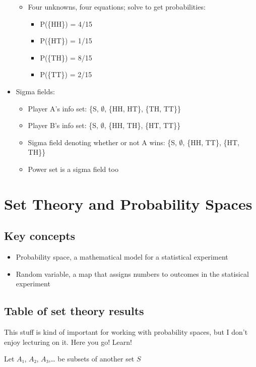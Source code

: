 \begin{itemize}
\begin{itemize}
\item Four unknowns, four equations; solve to get probabilities:
\begin{itemize}
\item P(\{HH\}) = 4/15
\item P(\{HT\}) = 1/15
\item P(\{TH\}) = 8/15
\item P(\{TT\}) = 2/15
\end{itemize}
\end{itemize}
\item Sigma fields:
\begin{itemize}
\item Player A's info set: \{S, $∅$, \{HH, HT\}, \{TH, TT\}\}
\item Player B's info set: \{S, $∅$, \{HH, TH\}, \{HT, TT\}\}
\item Sigma field denoting whether or not A wins: \{S, $∅$, \{HH,
  TT\}, \{HT, TH\}\}
\item Power set is a sigma field too
\end{itemize}
\end{itemize}

\section{Set Theory and Probability Spaces}

\subsection{Key concepts}

\begin{itemize}
\item Probability space, a mathematical model for a statistical experiment
\item Random variable, a map that assigns numbers to outcomes in the
       statisical experiment
\end{itemize}

\subsection{Table of set theory results}

This stuff is kind of important for working with probability spaces,
but I don't enjoy lecturing on it.  Here you go!  Learn!

Let $A₁$, $A₂$, $A₃$,… be subsets of another set $S$

